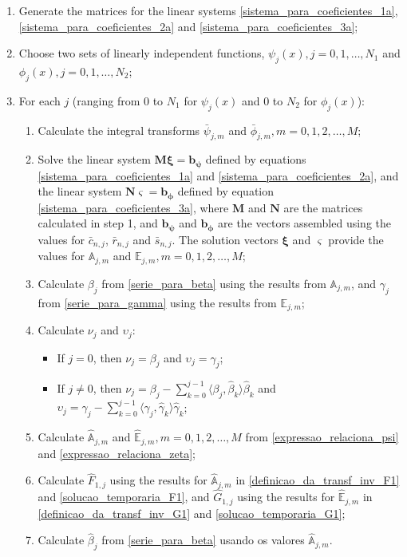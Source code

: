 \documentclass[conference,compsoc,fleqn]{IEEEtran}
\begin{document}
\begin{enumerate}
	\item Generate the matrices for the linear systems \eqref{sistema_para_coeficientes_1a},  \eqref{sistema_para_coeficientes_2a} and \eqref{sistema_para_coeficientes_3a};
	\item Choose two sets of linearly independent functions, $\psi_j(x), j=0,1,\ldots,N_1$ and $\phi_j(x), j=0,1,\ldots,N_2$;
	\item For each $j$ (ranging from 0 to $N_1$ for $\psi_j(x)$ and 0 to $N_2$ for $\phi_j(x)$):
	\begin{enumerate}	
		\item Calculate the integral transforms $\bar{\psi}_{j,m}$ and $\bar{\phi}_{j,m}, m=0,1,2, \ldots, M$;
		\item Solve the linear system $\mathbf{M}\mathbf{\xi} = \mathbf{b_\psi}$ defined by equations \eqref{sistema_para_coeficientes_1a} and \eqref{sistema_para_coeficientes_2a}, and the linear system $\mathbf{N}\mathbf{\varsigma} = \mathbf{b_\phi}$ defined by equation \eqref{sistema_para_coeficientes_3a}, where $\mathbf{M}$ and $\mathbf{N}$ are the matrices calculated in step 1, and $\mathbf{b_\psi}$ and $\mathbf{b_\phi}$ are the vectors assembled using the values for $\bar{c}_{n,j}$, $\bar{r}_{n,j}$ and $\bar{s}_{n,j}$. The solution vectors $\mathbf{\xi}$ and $\mathbf{\varsigma}$ provide the values for $\mathbb{A}_{j,m}$ and $\mathbb{E}_{j,m}, m=0,1,2, \ldots, M$;
		\item Calculate $\beta_j$ from \eqref{serie_para_beta} using the results from $\mathbb{A}_{j,m}$, and $\gamma_j$ from \eqref{serie_para_gamma} using the results from $\mathbb{E}_{j,m}$;
		\item Calculate $\nu_j$ and $\upsilon_j$:
		\begin{itemize}
			\item If $j = 0$, then $\nu_j = \beta_j$ and $\upsilon_j = \gamma_j$;
			\item If $j \ne 0$, then $\nu_j = \beta_j - \displaystyle\sum_{k = 0}^{j - 1} \langle \beta_j, \hat{\beta}_k\rangle\hat{\beta}_k$ and $\upsilon_j = \gamma_j - \displaystyle\sum_{k = 0}^{j - 1} \langle \gamma_j, \hat{\gamma}_k\rangle\hat{\gamma}_k$;
		\end{itemize}
		\item Calculate $\hat{\mathbb{A}}_{j,m}$ and $\hat{\mathbb{E}}_{j,m}, m=0,1,2, \ldots, M$ from \eqref{expressao_relaciona_psi} and \eqref{expressao_relaciona_zeta};
		\item Calculate $\hat{F}_{1,j}$ using the results for $\hat{\mathbb{A}}_{j,m}$ in \eqref{definicao_da_transf_inv_F1} and \eqref{solucao_temporaria_F1}, and $\hat{G}_{1,j}$ using the results for $\hat{\mathbb{E}}_{j,m}$ in \eqref{definicao_da_transf_inv_G1} and \eqref{solucao_temporaria_G1};
		\item Calculate $\hat{\beta}_j$ from \eqref{serie_para_beta} usando os valores $\hat{\mathbb{A}}_{j,m}$.
	\end{enumerate}
\end{enumerate}
\end{document}
